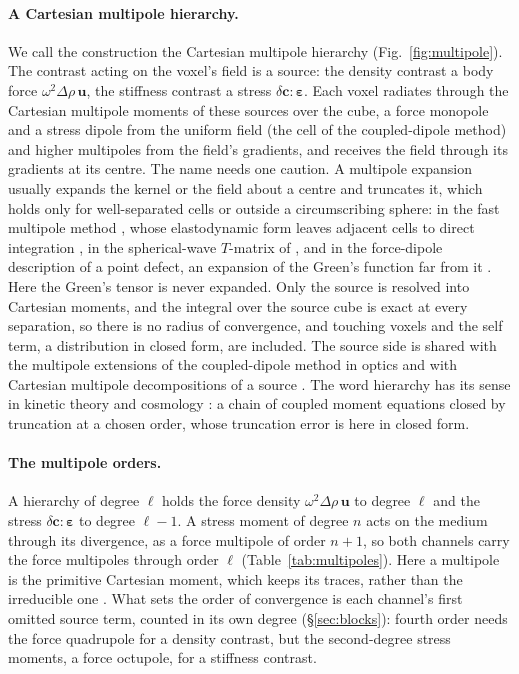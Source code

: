 \documentclass[11pt,a4paper]{article}
\begin{document}
\paragraph{A Cartesian multipole hierarchy.} We call the construction the Cartesian multipole
hierarchy (Fig.~\ref{fig:multipole}). The contrast acting on the voxel's field is a source: the density
contrast a body force $\omega^2\Delta\rho\,\mathbf{u}$, the stiffness contrast a stress
$\delta\mathbf{c}:\boldsymbol\varepsilon$. Each voxel radiates through the Cartesian multipole moments of
these sources over the cube, a force monopole and a stress dipole from the uniform field (the cell of the
coupled-dipole method) and higher multipoles from the field's gradients, and receives the field through
its gradients at its centre. The name needs one caution. A multipole expansion usually expands the kernel
or the field about a centre and truncates it, which holds only for well-separated cells or outside a
circumscribing sphere: in the fast multipole method \citep{CarrierGreengardRokhlin1988}, whose
elastodynamic form leaves adjacent cells to direct integration \citep{ChaillatBonnetSemblat2007}, in the
spherical-wave $T$-matrix of \citet{Waterman1976}, and in the force-dipole description of a point defect,
an expansion of the Green's function far from it \citep{Clouet2018}. Here the Green's tensor is never
expanded. Only the source is resolved into Cartesian moments, and the integral over the source cube is
exact at every separation, so there is no radius of convergence, and touching voxels and the self term,
a distribution in closed form, are included. The source side is shared with the multipole extensions of
the coupled-dipole method in optics \citep{Evlyukhin2011,Ustimenko2022} and with Cartesian multipole
decompositions of a source \citep{Riccardi2022}. The word hierarchy has its sense in kinetic theory and
cosmology \citep{MaBertschinger1995}: a chain of coupled moment equations closed by truncation at a
chosen order, whose truncation error is here in closed form.

\paragraph{The multipole orders.} A hierarchy of degree $\ell$ holds the force density $\omega^2\Delta\rho\,
\mathbf{u}$ to degree $\ell$ and the stress $\delta\mathbf{c}:\boldsymbol\varepsilon$ to degree $\ell-1$.
A stress moment of degree $n$ acts on the medium through its divergence, as a force multipole of order
$n+1$, so both channels carry the force multipoles through order $\ell$ (Table~\ref{tab:multipoles}).
Here a multipole is the primitive Cartesian moment, which keeps its traces, rather than the irreducible
one \citep{Riccardi2022}. What sets the order of convergence is each channel's first omitted source
term, counted in its own degree (\S\ref{sec:blocks}): fourth order needs the force quadrupole for a
density contrast, but the second-degree stress moments, a force octupole, for a stiffness contrast.
\end{document}
